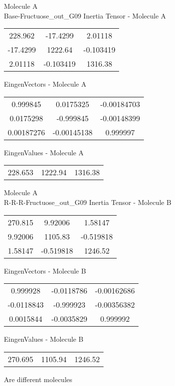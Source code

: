 \newpage
\begin{multicols}{2}
\begin{center}
Molecule A \\ 
Base-Fructuose_out_G09
Inertia Tensor - Molecule A \\
\vtab
\begin{tabular}{|c c c|}
228.962	 & 	-17.4299	 & 	2.01118	 \\
-17.4299	 & 	1222.64	 & 	-0.103419	 \\
2.01118	 & 	-0.103419	 & 	1316.38
\end{tabular}

\vtab
 EingenVectors - Molecule A     \\
\vtab
\begin{tabular}{|c c c|}
0.999845	 & 	0.0175325	 & 	-0.00184703	 \\
0.0175298	 & 	-0.999845	 & 	-0.00148399	 \\
0.00187276	 & 	-0.00145138	 & 	0.999997
\end{tabular}

\vtab
 EingenValues - Molecule A     \\
\vtab
\begin{tabular}{|c c c|}
228.653	 & 	1222.94	 & 	1316.38
\end{tabular}
\columnbreak
Molecule A \\ 
R-R-R-Fructuose_out_G09
Inertia Tensor - Molecule B \\
\vtab
\begin{tabular}{|c c c|}
270.815	 & 	9.92006	 & 	1.58147	 \\
9.92006	 & 	1105.83	 & 	-0.519818	 \\
1.58147	 & 	-0.519818	 & 	1246.52
\end{tabular}

\vtab
 EingenVectors - Molecule B     \\
\vtab
\begin{tabular}{|c c c|}
0.999928	 & 	-0.0118786	 & 	-0.00162686	 \\
-0.0118843	 & 	-0.999923	 & 	-0.00356382	 \\
0.0015844	 & 	-0.0035829	 & 	0.999992
\end{tabular}

\vtab
 EingenValues - Molecule B     \\
\vtab
\begin{tabular}{|c c c|}
270.695	 & 	1105.94	 & 	1246.52
\end{tabular}
\textcolor{NavyBlue}{\large Are different molecules}
\end{center}
\end{multicols}
